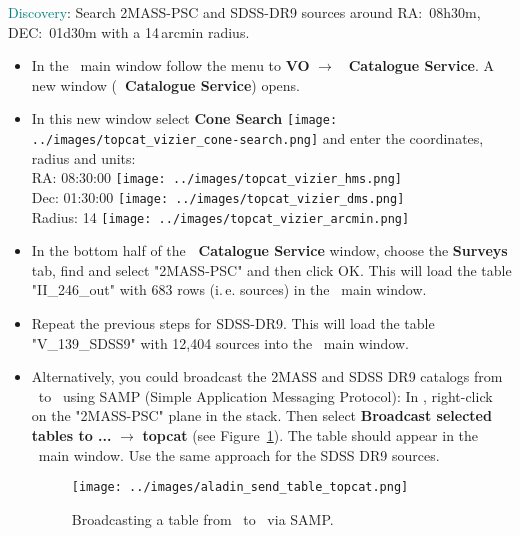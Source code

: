 \documentclass [a4paper, 12pt]{article}
\begin{document}
\noindent \textcolor{teal}{Discovery}: Search 2MASS-PSC and SDSS-DR9 sources
around RA:~08h30m, DEC:~01d30m with a 14\,arcmin radius.
\begin{itemize}
    \item In the \topcat\ main window follow the menu to \textbf{VO}
    $\rightarrow$ \textbf{\vizier\ Catalogue Service}. A new window
    (\textbf{\vizier\ Catalogue Service}) opens.
    \item In this new window select \textbf{Cone Search}
    \texttt{[image: ../images/topcat\_vizier\_cone-search.png]} and enter the
    coordinates, radius and units:\\
    RA: 08:30:00 \texttt{[image: ../images/topcat\_vizier\_hms.png]}\\
    Dec: 01:30:00 \texttt{[image: ../images/topcat\_vizier\_dms.png]}\\
    Radius: 14 \texttt{[image: ../images/topcat\_vizier\_arcmin.png]}
    \item In the bottom half of the \textbf{\vizier\ Catalogue Service} window,
    choose the \textbf{Surveys} tab, find and select "2MASS-PSC" and then click
    OK. This will load the table "II\_246\_out" with 683 rows (i.\,e. sources)
    in
    the \topcat\ main window.
    \item Repeat the previous steps for SDSS-DR9. This will load the table
    "V\_139\_SDSS9" with 12,404 sources into the \topcat\ main window.
    \item Alternatively, you could broadcast the 2MASS and SDSS DR9 catalogs
    from \aladin\ to \topcat\ using SAMP (Simple Application Messaging
    Protocol): In \aladin, right-click on the "2MASS-PSC" plane in the stack.
    Then select \textbf{Broadcast selected tables to ...} $\rightarrow$
    \textbf{topcat} (see Figure~\ref{fig:broadcast_aladin_topcat}). The table
    should appear in the \topcat\ main window. Use
    the same approach for the SDSS DR9 sources.
    \begin{figure}[H]
        \center
        \texttt{[image: ../images/aladin\_send\_table\_topcat.png]}
        \caption{Broadcasting a table from \aladin\ to \topcat\ via SAMP. }
        \label{fig:broadcast_aladin_topcat}
    \end{figure}
\end{itemize}
\end{document}
